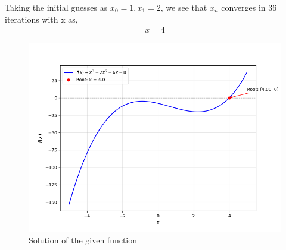 \documentclass[journal]{IEEEtran}
\begin{document}
Taking the initial guesses as $x_0 = 1, x_1 = 2$, we see that $x_n$ converges in 36 iterations with x as,
\begin{align}
	x = 4
\end{align} 
	\begin{figure}[h!]
		\centering
		\includegraphics[width=\columnwidth]{figs/fig1.png}
		\caption{Solution of the given function}
		\label{stemplot}
	\end{figure}
	
\end{document}
